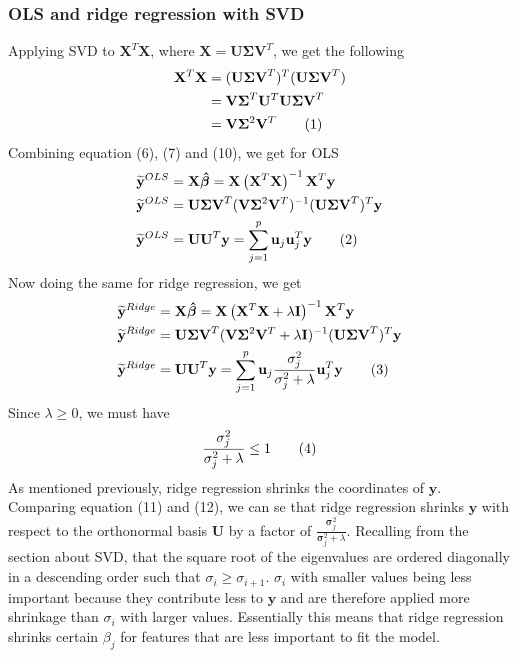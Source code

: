 \documentclass[a4paper,twocolumn]{article}
\newcommand\numberthis{\addtocounter{equation}{1}\tag{\theequation}}
\newcommand{\y}{\mathbf{y}}
\newcommand{\ytilde}{\mathbf{\widetilde{y}}}
\newcommand{\X}{\mathbf{X}}
\newcommand{\Bhat}{\boldsymbol{\hat{\beta}}}
\begin{document}
\subsubsection{OLS and ridge regression with SVD}
Applying SVD to $\X^{T}\X$, where $\X = \mathbf{U\Sigma V}^{T}$, we get the following
\begin{align*}
    \X^{T}\X &= (\mathbf{U\Sigma V}^{T})^{T}(\mathbf{U\Sigma V}^{T})\\
    &= \mathbf{V\Sigma}^{T}\mathbf{U}^{T}\mathbf{U\Sigma V}^{T}\\
    &= \mathbf{V}\mathbf{\Sigma}^{2}\mathbf{V}^{T}\numberthis\label{eqn}
\end{align*}
Combining equation (6), (7) and (10), we get for OLS
\begin{align*}
    \ytilde^{OLS} &= \X\Bhat = \X\left(\X^{T}\X\right)^{-1}\X^{T}\y\\
    \ytilde^{OLS} &= \mathbf{U\Sigma V}^{T}(\mathbf{V}\mathbf{\Sigma}^{2}\mathbf{V}^{T})^{-1}(\mathbf{U\Sigma V}^{T})^{T}\y\\
    \ytilde^{OLS} &= \mathbf{UU}^{T}\y = \sum_{j=1}^{p}\mathbf{u}_{j}\mathbf{u}_{j}^{T}\y \numberthis\label{eqn}
\end{align*}
Now doing the same for ridge regression, we get
\begin{align*}
        \ytilde^{Ridge} &= \X\Bhat = \X\left(\X^{T}\X + \lambda \mathbf{I}\right)^{-1}\X^{T}\y\\
    \ytilde^{Ridge} &= \mathbf{U\Sigma V}^{T}(\mathbf{V}\mathbf{\Sigma}^{2}\mathbf{V}^{T} + \lambda\mathbf{I})^{-1}(\mathbf{U\Sigma V}^{T})^{T}\y\\
    \ytilde^{Ridge} &= \mathbf{UU}^{T}\y = \sum_{j=1}^{p}\mathbf{u}_{j}\frac{\mathbf{\sigma}_{j}^{2}}{\mathbf{\sigma}_{j}^{2} + \lambda}\mathbf{u}_{j}^{T}\y \numberthis\label{eqn}
\end{align*}
Since $\lambda \geq 0$, we must have
\begin{align*}
    \frac{\mathbf{\sigma}_{j}^{2}}{\mathbf{\sigma}_{j}^{2} + \lambda} \leq 1 \numberthis\label{eqn}
\end{align*}
As mentioned previously, ridge regression shrinks the coordinates of $\y$. Comparing equation (11) and (12), we can se that ridge regression shrinks $\y$ with respect to the orthonormal basis $\mathbf{U}$ by a factor of $\frac{\mathbf{\sigma}_{j}^{2}}{\mathbf{\sigma}_{j}^{2} + \lambda}$. Recalling from the section about SVD, that the square root of the eigenvalues are ordered diagonally in a descending order such that $\sigma_{i} \geq \sigma_{i+1}$. $\sigma_{i}$ with smaller values being less important because they contribute less to $\y$ and are therefore applied more shrinkage than $\sigma_{i}$ with larger values. Essentially this means that ridge regression shrinks certain $\beta_{j}$ for features that are less important to fit the model.
\end{document}
